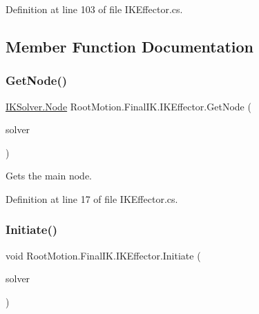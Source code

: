 Definition at line 103 of file I\+K\+Effector.\+cs.



\subsection{Member Function Documentation}
\mbox{\label{class_root_motion_1_1_final_i_k_1_1_i_k_effector_a33923cbb6bb0f5a8f065194bc793d2cf}} 
\subsubsection{\texorpdfstring{Get\+Node()}{GetNode()}}
{\footnotesize\ttfamily \mbox{\hyperlink{class_root_motion_1_1_final_i_k_1_1_i_k_solver_1_1_node}{I\+K\+Solver.\+Node}} Root\+Motion.\+Final\+I\+K.\+I\+K\+Effector.\+Get\+Node (\begin{DoxyParamCaption}\item[{\mbox{\hyperlink{class_root_motion_1_1_final_i_k_1_1_i_k_solver_full_body}{I\+K\+Solver\+Full\+Body}}}]{solver }\end{DoxyParamCaption})}



Gets the main node. 



Definition at line 17 of file I\+K\+Effector.\+cs.

\mbox{\label{class_root_motion_1_1_final_i_k_1_1_i_k_effector_a10b51db799b0056619da99d7273f2653}} 
\subsubsection{\texorpdfstring{Initiate()}{Initiate()}}
{\footnotesize\ttfamily void Root\+Motion.\+Final\+I\+K.\+I\+K\+Effector.\+Initiate (\begin{DoxyParamCaption}\item[{\mbox{\hyperlink{class_root_motion_1_1_final_i_k_1_1_i_k_solver_full_body}{I\+K\+Solver\+Full\+Body}}}]{solver }\end{DoxyParamCaption})}



